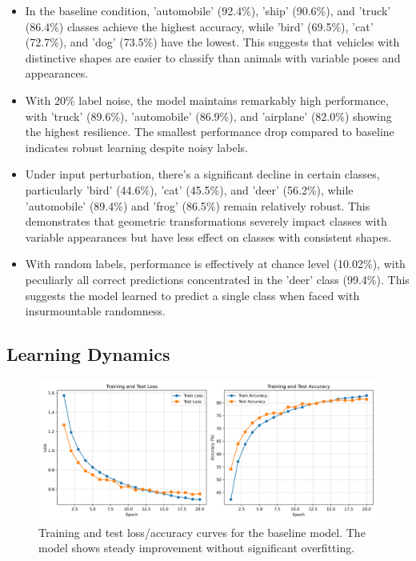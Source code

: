 \documentclass[10pt,twocolumn,letterpaper]{article}
\begin{document}
\begin{itemize}
    \item In the baseline condition, 'automobile' (92.4\%), 'ship' (90.6\%), and 'truck' (86.4\%) classes achieve the highest accuracy, while 'bird' (69.5\%), 'cat' (72.7\%), and 'dog' (73.5\%) have the lowest. This suggests that vehicles with distinctive shapes are easier to classify than animals with variable poses and appearances.
    \item With 20\% label noise, the model maintains remarkably high performance, with 'truck' (89.6\%), 'automobile' (86.9\%), and 'airplane' (82.0\%) showing the highest resilience. The smallest performance drop compared to baseline indicates robust learning despite noisy labels.
    \item Under input perturbation, there's a significant decline in certain classes, particularly 'bird' (44.6\%), 'cat' (45.5\%), and 'deer' (56.2\%), while 'automobile' (89.4\%) and 'frog' (86.5\%) remain relatively robust. This demonstrates that geometric transformations severely impact classes with variable appearances but have less effect on classes with consistent shapes.
    \item With random labels, performance is effectively at chance level (10.02\%), with peculiarly all correct predictions concentrated in the 'deer' class (99.4\%). This suggests the model learned to predict a single class when faced with insurmountable randomness.
\end{itemize}

\subsection{Learning Dynamics}

\begin{figure}[t]
  \centering
  \includegraphics[width=0.9\linewidth]{results/baseline_curves.png}
  \caption{Training and test loss/accuracy curves for the baseline model. The model shows steady improvement without significant overfitting.}
  \label{fig:baseline_curves}
\end{figure}
\end{document}
